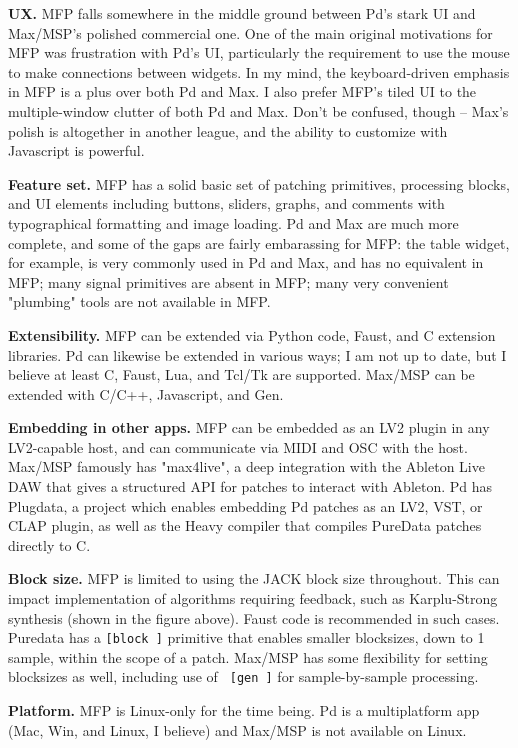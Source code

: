 \documentclass[a4paper]{article}
\begin{document}
{\bf UX.} MFP falls somewhere in the middle ground between Pd's
stark UI and Max/MSP's polished commercial one. One of the main
original motivations for MFP was frustration with Pd's UI,
particularly the requirement to use the mouse to make connections
between widgets. In my mind, the keyboard-driven emphasis in MFP
is a plus over both Pd and Max. I also prefer MFP's tiled UI to
the multiple-window clutter of both Pd and Max. Don't be
confused, though -- Max's polish is altogether in another league,
and the ability to customize with Javascript is powerful.

{\bf Feature set.} MFP has a solid basic set of patching
primitives, processing blocks, and UI elements including buttons,
sliders, graphs, and comments with typographical formatting and
image loading. Pd and Max are much more complete, and some of the
gaps are fairly embarassing for MFP: the table widget, for
example, is very commonly used in Pd and Max, and has no
equivalent in MFP; many signal primitives are absent in MFP; many
very convenient "plumbing" tools are not available in MFP.

{\bf Extensibility.} MFP can be extended via Python code, Faust,
and C extension libraries. Pd can likewise be extended in various
ways; I am not up to date, but I believe at least C, Faust, Lua,
and Tcl/Tk are supported. Max/MSP can be extended with C/C++,
Javascript, and Gen.

{\bf Embedding in other apps.} MFP can be embedded as an LV2
plugin in any LV2-capable host, and can communicate via MIDI and
OSC with the host. Max/MSP famously has "max4live", a deep
integration with the Ableton Live DAW that gives a structured API
for patches to interact with Ableton. Pd has Plugdata, a project
which enables embedding Pd patches as an LV2, VST, or CLAP
plugin, as well as the Heavy compiler that compiles PureData
patches directly to C.

{\bf Block size.} MFP is limited to using the JACK block size
throughout. This can impact implementation of algorithms
requiring feedback, such as Karplu-Strong synthesis (shown in the
figure above). Faust code is recommended in such cases. Puredata
has a {\tt [block~]} primitive that enables smaller blocksizes,
down to 1 sample, within the scope of a patch. Max/MSP has some
flexibility for setting blocksizes as well, including use of {\tt
[gen~]} for sample-by-sample processing.

{\bf Platform.} MFP is Linux-only for the time being. Pd is a
multiplatform app (Mac, Win, and Linux, I believe) and Max/MSP
is not available on Linux.
\end{document}

